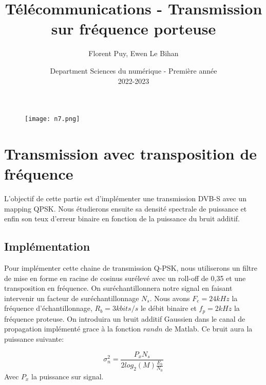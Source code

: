 \documentclass[englishb]{article}
\begin{document}
\begin{figure}[t]
\centering
\texttt{[image: n7.png]}
\end{figure}

\title{\vspace{4cm} \textbf{Télécommunications - Transmission sur fréquence porteuse}}
\author{Florent Puy, Ewen Le Bihan\\ }
\date{\vspace{7cm} Department Sciences du numérique - Première année \\
2022-2023 }

\maketitle

\newpage
\tableofcontents


\newpage

\maketitle

\section{Transmission avec transposition de fréquence}

L'objectif de cette partie est d'implémenter une transmission DVB-S avec un mapping QPSK. Nous étudierons ensuite sa densité spectrale de puissance et enfin son teux d'erreur binaire en fonction de la puissance du bruit additif.

\subsection{Implémentation}
Pour implémenter cette chaine de transmission Q-PSK, nous utiliserons un filtre de mise en forme en racine de cosinus surélevé avec un roll-off de 0,35 et une transposition en fréquence. On suréchantillonnera notre signal en faisant intervenir un facteur de suréchantillonnage $N_s$.
Nous avons $F_e=24 kHz$ la fréquence d'échantillonnage, $R_b = 3 kbits/s$ le débit binaire et $f_p = 2 kHz$ la fréquence proteuse. On introduira un bruit additif Gaussien dans le canal de propagation implémenté grace à la fonction $randn$ de Matlab. Ce bruit aura la puissance suivante:

\begin{center}

$$\sigma^2 _n = \frac{P_x N_s}{2log_2 (M) \frac{E_b}{N_0}}$$ Avec $P_x$ la puissance sur signal.

\end{center}
\end{document}

